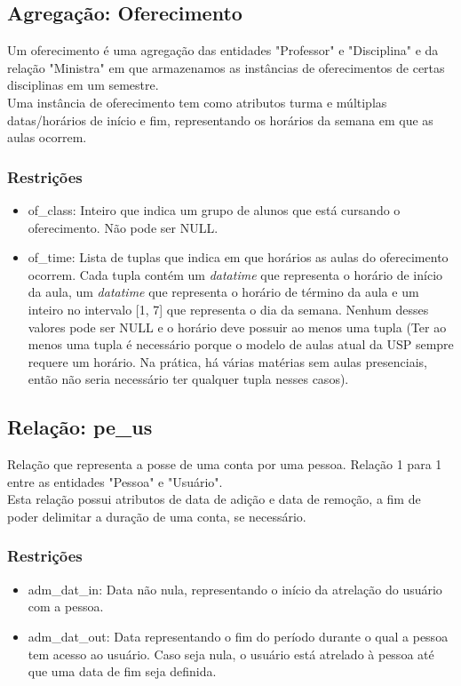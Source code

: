\documentclass{article}
\begin{document}
    \subsection{Agregação: Oferecimento}
        \quad Um oferecimento é uma agregação das entidades "Professor" e "Disciplina" e da relação "Ministra" em que armazenamos as instâncias de oferecimentos de certas disciplinas em um semestre. \\
        \quad Uma instância de oferecimento tem como atributos turma e múltiplas datas/horários de início e fim, representando os horários da semana em que as aulas ocorrem. 
        \subsubsection{Restrições}
            \begin{itemize}
                \item of\_class: Inteiro que indica um grupo de alunos que está cursando o oferecimento. Não pode ser NULL.
                \item of\_time: Lista de tuplas que indica em que horários as aulas do oferecimento ocorrem. Cada tupla contém um \textit{datatime} que representa o horário de início da aula, um \textit{datatime} que representa o horário de término da aula e um inteiro no intervalo [1, 7] que representa o dia da semana. Nenhum desses valores pode ser NULL e o horário deve possuir ao menos uma tupla (Ter ao menos uma tupla é necessário porque o modelo de aulas atual da USP sempre requere um horário. Na prática, há várias matérias sem aulas presenciais, então não seria necessário ter qualquer tupla nesses casos).
             \end{itemize}
        
    \subsection{Relação: pe\_us}
        \quad Relação que representa a posse de uma conta por uma pessoa. Relação 1 para 1 entre as entidades "Pessoa" e "Usuário". \\
        \quad Esta relação possui atributos de data de adição e data de remoção, a fim de poder delimitar a duração de uma conta, se necessário.
        \subsubsection{Restrições}
            \begin{itemize}
                \item adm\_dat\_in: Data não nula, representando o início da atrelação do usuário com a pessoa.
                \item adm\_dat\_out: Data representando o fim do período durante o qual a pessoa tem acesso ao usuário. Caso seja nula, o usuário está atrelado à pessoa até que uma data de fim seja definida.
            \end{itemize}
        
\end{document}
